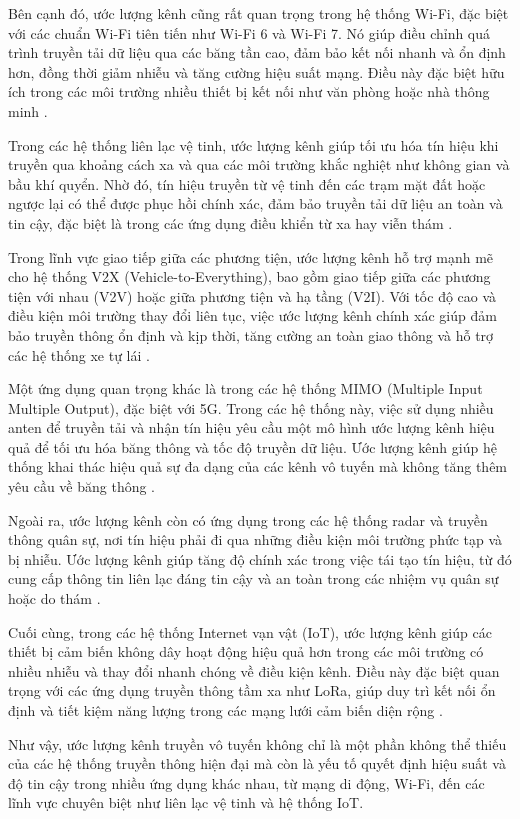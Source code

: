 Bên cạnh đó, ước lượng kênh cũng rất quan trọng trong hệ thống Wi-Fi, đặc biệt với các chuẩn Wi-Fi tiên tiến như Wi-Fi 6 và Wi-Fi 7. Nó giúp điều chỉnh quá trình truyền tải dữ liệu qua các băng tần cao, đảm bảo kết nối nhanh và ổn định hơn, đồng thời giảm nhiễu và tăng cường hiệu suất mạng. Điều này đặc biệt hữu ích trong các môi trường nhiều thiết bị kết nối như văn phòng hoặc nhà thông minh \cite{Bellalta2016}.

Trong các hệ thống liên lạc vệ tinh, ước lượng kênh giúp tối ưu hóa tín hiệu khi truyền qua khoảng cách xa và qua các môi trường khắc nghiệt như không gian và bầu khí quyển. Nhờ đó, tín hiệu truyền từ vệ tinh đến các trạm mặt đất hoặc ngược lại có thể được phục hồi chính xác, đảm bảo truyền tải dữ liệu an toàn và tin cậy, đặc biệt là trong các ứng dụng điều khiển từ xa hay viễn thám \cite{Huang2021}.

Trong lĩnh vực giao tiếp giữa các phương tiện, ước lượng kênh hỗ trợ mạnh mẽ cho hệ thống V2X (Vehicle-to-Everything), bao gồm giao tiếp giữa các phương tiện với nhau (V2V) hoặc giữa phương tiện và hạ tầng (V2I). Với tốc độ cao và điều kiện môi trường thay đổi liên tục, việc ước lượng kênh chính xác giúp đảm bảo truyền thông ổn định và kịp thời, tăng cường an toàn giao thông và hỗ trợ các hệ thống xe tự lái \cite{Pan2021}.

Một ứng dụng quan trọng khác là trong các hệ thống MIMO (Multiple Input Multiple Output), đặc biệt với 5G. Trong các hệ thống này, việc sử dụng nhiều anten để truyền tải và nhận tín hiệu yêu cầu một mô hình ước lượng kênh hiệu quả để tối ưu hóa băng thông và tốc độ truyền dữ liệu. Ước lượng kênh giúp hệ thống khai thác hiệu quả sự đa dạng của các kênh vô tuyến mà không tăng thêm yêu cầu về băng thông \cite{Chun2019}.

Ngoài ra, ước lượng kênh còn có ứng dụng trong các hệ thống radar và truyền thông quân sự, nơi tín hiệu phải đi qua những điều kiện môi trường phức tạp và bị nhiễu. Ước lượng kênh giúp tăng độ chính xác trong việc tái tạo tín hiệu, từ đó cung cấp thông tin liên lạc đáng tin cậy và an toàn trong các nhiệm vụ quân sự hoặc do thám \cite{Hampton2008}.

Cuối cùng, trong các hệ thống Internet vạn vật (IoT), ước lượng kênh giúp các thiết bị cảm biến không dây hoạt động hiệu quả hơn trong các môi trường có nhiều nhiễu và thay đổi nhanh chóng về điều kiện kênh. Điều này đặc biệt quan trọng với các ứng dụng truyền thông tầm xa như LoRa, giúp duy trì kết nối ổn định và tiết kiệm năng lượng trong các mạng lưới cảm biến diện rộng \cite{Demetri2019}.

Như vậy, ước lượng kênh truyền vô tuyến không chỉ là một phần không thể thiếu của các hệ thống truyền thông hiện đại mà còn là yếu tố quyết định hiệu suất và độ tin cậy trong nhiều ứng dụng khác nhau, từ mạng di động, Wi-Fi, đến các lĩnh vực chuyên biệt như liên lạc vệ tinh và hệ thống IoT.